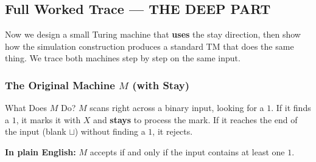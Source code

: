 \subsection{Full Worked Trace --- THE DEEP PART}

Now we design a small Turing machine that \textbf{uses} the stay direction, then show how the simulation construction produces a standard TM that does the same thing. We trace both machines step by step on the same input.

\subsubsection{The Original Machine $M$ (with Stay)}

\begin{notebox}{What Does $M$ Do?}
$M$ scans right across a binary input, looking for a $1$. If it finds a $1$, it marks it with $X$ and \textbf{stays} to process the mark. If it reaches the end of the input (blank $\sqcup$) without finding a $1$, it rejects.

\textbf{In plain English:} $M$ accepts if and only if the input contains at least one $1$.
\end{notebox}

